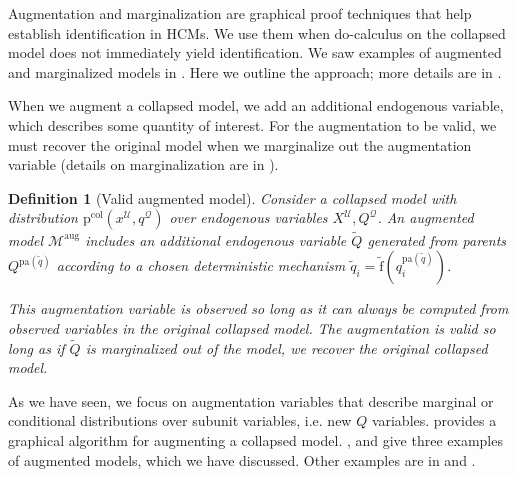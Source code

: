\documentclass[12pt]{article}
\newtheorem{definition}{Definition}
\newcommand{\Uc}{\mathcal{U}}
\newcommand{\pa}{\mathrm{pa}}
\newcommand{\pr}{\mathrm{p}}
\newcommand{\f}{\mathrm{f}}
\newcommand{\col}{\mathrm{col}}
\newcommand{\aug}{\mathrm{aug}}
\newcommand{\Mc}{\mathcal{M}}
\begin{document}
Augmentation and marginalization are graphical proof techniques that
help establish identification in HCMs.  We use them when do-calculus
on the collapsed model does not immediately yield identification.  We
saw examples of augmented and marginalized models in
.  Here we outline the
approach; more details are in .

When we augment a collapsed model, we add an additional endogenous
variable, which describes some quantity of interest.  For the
augmentation to be valid, we must recover the original model when we
marginalize out the augmentation variable (details on marginalization are in ).
\begin{definition}[Valid augmented model]
  \label{def:valid_augment}
  Consider a collapsed model with distribution
  $\pr^\col(x^{\Uc},q^{\mathcal{Q}})$ over endogenous variables
  $X^{\Uc},Q^{\mathcal{Q}}$.  An augmented model $\Mc^\aug$ includes
  an additional endogenous variable $\tilde{Q}$ generated from parents
  $Q^{\pa(\tilde{q})}$ according to a chosen deterministic mechanism
  $\tilde{q}_i =\tilde{\f}(q^{\pa(\tilde{q})}_i)$.







  This augmentation variable is observed so long as it can always be
  computed from observed variables in the original collapsed model.
  The augmentation is valid so long as if $\tilde{Q}$ is marginalized
  out of the model, we recover the original collapsed model.
\end{definition}

As we have seen, we focus on augmentation variables that describe
marginal or conditional distributions over subunit variables, i.e. new
$Q$ variables.  provides a graphical algorithm for
augmenting a collapsed model.  ,  and  give three
examples of augmented models, which we have discussed. Other examples
are in  and .

\end{document}
